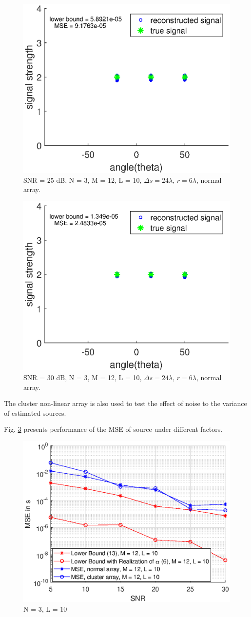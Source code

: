 \documentclass[proposal]{umthesis}          %
\begin{document}
\begin{figure}[H]
	\centering
	\includegraphics[width=0.6\columnwidth]{./results/noise_effect_25db_normal}
	\caption{SNR = 25 dB, N = 3, M = 12, L = 10, $\Delta s = 24 \lambda$, $r = 6\lambda$, normal array.}
	\label{fig:noise_effect_25db_normal}
\end{figure}

\begin{figure}[H]
	\centering
	\includegraphics[width=0.6\columnwidth]{./results/noise_effect_30db_normal}
	\caption{SNR = 30 dB, N = 3, M = 12, L = 10, $\Delta s = 24 \lambda$, $r = 6\lambda$, normal array.}
	\label{fig:noise_effect_30db_normal}
\end{figure}

The cluster non-linear array is also used to test the effect of noise to the variance of estimated sources.

Fig. \ref{fig:effect_sigma_square_to_source} presents performance of the MSE of source under different factors.

\begin{figure}[H]
	\centering
	\includegraphics[width=0.6\columnwidth]{./results/change_of_source_with_sigma}
	\caption{N = 3, L = 10}
	\label{fig:effect_sigma_square_to_source}
\end{figure}
\end{document}
